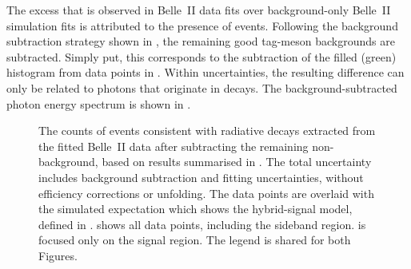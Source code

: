 The excess that is observed in Belle~II data fits over background-only Belle~II simulation fits is attributed to the presence of \BtoXsdgamma events.
Following the background subtraction strategy shown in ,
the remaining good tag-\B meson backgrounds are subtracted.
Simply put, this corresponds to the subtraction of the filled (green) histogram from data points in .
Within uncertainties, the resulting difference can only be related to photons that originate in \BtoXsdgamma decays.
The background-subtracted photon energy spectrum is shown in .
\begin{figure}[htbp]
    \caption{\label{fig:subtracted_results}
        The counts of events consistent with radiative decays extracted from the fitted Belle~II data after subtracting the remaining non-\BtoXsdgamma background,
        based on results summarised in .
        The total uncertainty includes background subtraction and fitting uncertainties, without efficiency corrections or unfolding.
        The data points are overlaid with the simulated expectation which shows the hybrid-signal model, defined in .
         shows all data points, including the sideband region.
         is focused only on the signal region.
        The legend is shared for both Figures.
    }
\end{figure}

